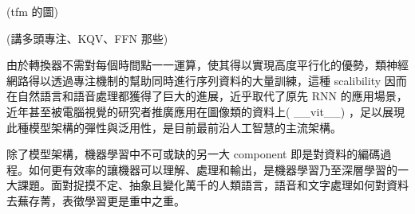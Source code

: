 (tfm 的圖)

(講多頭專注、KQV、FFN 那些)

由於轉換器不需對每個時間點一一運算，使其得以實現高度平行化的優勢，類神經網路得以透過專注機制的幫助同時進行序列資料的大量訓練，這種 scalibility 因而在自然語言和語音處理都獲得了巨大的進展，近乎取代了原先 RNN 的應用場景，近年甚至被電腦視覺的研究者推廣應用在圖像類的資料上( \_\_vit\_\_) ，足以展現此種模型架構的彈性與泛用性，是目前最前沿人工智慧的主流架構。

除了模型架構，機器學習中不可或缺的另一大 component 即是對資料的編碼過程。如何更有效率的讓機器可以理解、處理和輸出，是機器學習乃至深層學習的一大課題。面對捉摸不定、抽象且變化萬千的人類語言，語音和文字處理如何對資料去蕪存菁，表徵學習更是重中之重。

